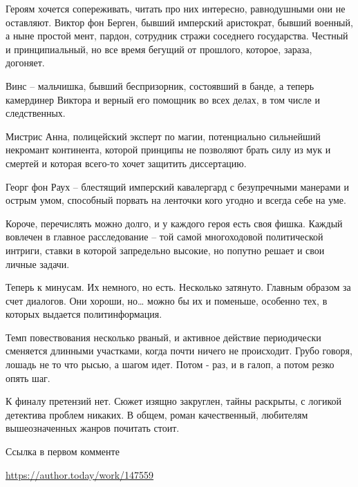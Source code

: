Героям хочется сопереживать, читать про них интересно, равнодушными они не
оставляют. Виктор фон Берген, бывший имперский аристократ, бывший военный, а
ныне простой мент, пардон, сотрудник стражи соседнего государства. Честный и
принципиальный, но все время бегущий от прошлого, которое, зараза, догоняет.

Винс – мальчишка, бывший беспризорник, состоявший в банде, а теперь камердинер
Виктора и верный его помощник во всех делах, в том числе и следственных.

Мистрис Анна, полицейский эксперт по магии, потенциально сильнейший некромант
континента, которой принципы не позволяют брать силу из мук и смертей и которая
всего-то хочет защитить диссертацию.

Георг фон Раух – блестящий имперский кавалергард с безупречными манерами и
острым умом, способный порвать на ленточки кого угодно и всегда себе на уме.

Короче, перечислять можно долго, и у каждого героя есть своя фишка. Каждый
вовлечен в главное расследование – той самой многоходовой политической интриги,
ставки в которой запредельно высокие, но попутно решает и свои личные задачи.

Теперь к минусам. Их немного, но есть. Несколько затянуто. Главным образом за
счет диалогов. Они хороши, но… можно бы их и поменьше, особенно тех, в которых
выдается политинформация.

Темп повествования несколько рваный, и активное действие периодически сменяется
длинными участками, когда почти ничего не происходит. Грубо говоря, лошадь не
то что рысью, а шагом идет. Потом - раз, и в галоп, а потом резко опять шаг.

К финалу претензий нет. Сюжет изящно закруглен, тайны раскрыты, с логикой
детектива проблем никаких. В общем, роман качественный, любителям
вышеозначенных жанров почитать стоит.

Ссылка в первом комменте

\begin{itemize} %
\url{https://author.today/work/147559}
\end{itemize} %
